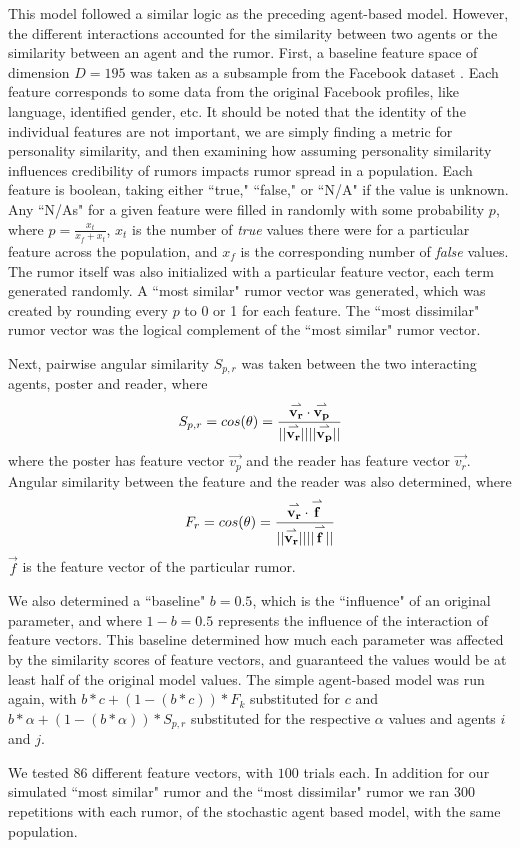 This model followed a similar logic as the preceding agent-based model. However,
the different interactions accounted for the similarity between two agents or
the similarity between an agent and the rumor. First, a baseline feature space
of dimension $ D = 195 $ was taken as a subsample from the Facebook dataset
\cite{mcauley-2014}. Each feature corresponds to some data from the original
Facebook profiles, like language, identified gender, etc. It should be noted
that the identity of the individual features are not important, we are simply
finding a metric for personality similarity, and then examining how assuming
personality similarity influences credibility of rumors impacts rumor spread in
a population. Each feature is boolean, taking either ``true," ``false," or
``N/A" if the value is unknown. Any ``N/As" for a given feature were filled in
randomly with some probability $ p $, where $ p = \frac{x_{t}}{x_{f} + x_{t}} $, $
x_{t} $ is the number of \textit{true} values there were for a particular
feature across the population, and $ x_{f} $ is the corresponding number of
\textit{false} values. The rumor itself was also initialized with a particular
feature vector, each term generated randomly. A ``most similar" rumor vector was
generated, which was created by rounding every $ p $ to 0 or 1 for each feature.
The ``most dissimilar" rumor vector was the logical complement of the ``most
similar" rumor vector.

Next, pairwise angular similarity $ S_{p,r} $ was taken between the two
interacting agents, poster and reader, where $$ S_{p,r} = cos(\theta) =
\frac{\overset{\rightharpoonup}{\mathbf{v_r}}\cdot\overset{\rightharpoonup}{\mathbf{v_p}}}{\lvert\lvert \overset{\rightharpoonup}{\mathbf{v_r}} \rvert\rvert \lvert\lvert \overset{\rightharpoonup}{\mathbf{v_p}} \rvert\rvert} $$ where the
poster has feature vector $ \vec{v_p} $ and the reader has feature vector $
\vec{v_r} $. Angular similarity between the feature and the reader was also
determined, where $$ F_r  = cos(\theta) =
\frac{\overset{\rightharpoonup}{\mathbf{v_r}}\cdot\overset{\rightharpoonup}{\mathbf{f}}}{\lvert\lvert \overset{\rightharpoonup}{\mathbf{v_r}} \rvert\rvert \lvert\lvert \overset{\rightharpoonup}{\mathbf{f}} \rvert\rvert} $$ $ \vec{f} $ is
the feature vector of the particular rumor.

We also determined a ``baseline" $ b = 0.5 $, which is the ``influence" of an
original parameter, and where $ 1 - b = 0.5 $ represents the influence of the
interaction of feature vectors. This baseline determined how much each parameter
was affected by the similarity scores of feature vectors, and guaranteed the
values would be at least half of the original model values. The simple
agent-based model was run again, with $ b*c + (1-(b*c))*F_k $ substituted for $
c $ and $ b*\alpha + (1-(b*\alpha))*S_{p,r} $ substituted for the respective $
\alpha $ values and agents $ i $ and $ j $.

We tested $ 86 $ different feature vectors, with $ 100 $ trials each. In
addition for our simulated ``most similar" rumor and the ``most dissimilar"
rumor  we ran $ 300 $ repetitions with each rumor, of the stochastic agent based
model, with the same population.
